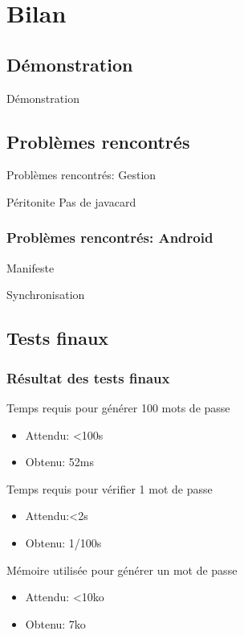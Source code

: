 \documentclass[xcolor=table]{beamer}
\begin{document}
\section{Bilan}

\subsection{Démonstration}
\begin{frame}
\begin{center}
\Huge{Démonstration}
\end{center}
\end{frame}


\subsection{Problèmes rencontrés}
\begin{frame}{Problèmes rencontrés: Gestion}
\begin{block}{Péritonite}
Pas de javacard
\end{block}

\end{frame}


\begin{frame}
\frametitle{Problèmes rencontrés: Android}
\begin{block}{Manifeste}

\end{block}

\begin{block}{Synchronisation}

\end{block}
\end{frame}

\subsection{Tests finaux}
\begin{frame}
\frametitle{Résultat des tests finaux}
\begin{block}{Temps requis pour générer 100 mots de passe}
\begin{itemize}
\item Attendu: \textless  100s
\item Obtenu: 52ms
\end{itemize}
\end{block}
\begin{block}{Temps requis pour vérifier 1 mot de passe}
\begin{itemize}
\item Attendu:\textless  2s
\item Obtenu: 1/100s
\end{itemize}
\end{block}
\begin{block}{Mémoire utilisée pour générer un mot de passe}
\begin{itemize}
\item Attendu: \textless  10ko
\item Obtenu: 7ko
\end{itemize}
\end{block}

\end{frame}
\end{document}
